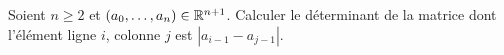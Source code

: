 \begin{exercice}
    Soient $n \geqslant 2$ et $(a_0, \dots, a_n) \in \mathbb{R}^{n+1}$. Calculer le déterminant de la matrice dont l'élément ligne $i$, colonne $j$ est $|a_{i-1} - a_{j-1}|$.
\end{exercice}